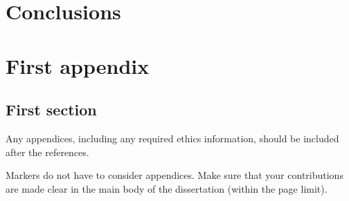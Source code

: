 \documentclass[logo,bsc,singlespacing,parskip,online]{infthesis}
\begin{document}
\chapter{Conclusions}






\appendix

\chapter{First appendix}



\section{First section}

Any appendices, including any required ethics information, should be included
after the references.

Markers do not have to consider appendices. Make sure that your contributions
are made clear in the main body of the dissertation (within the page limit).
\end{document}
